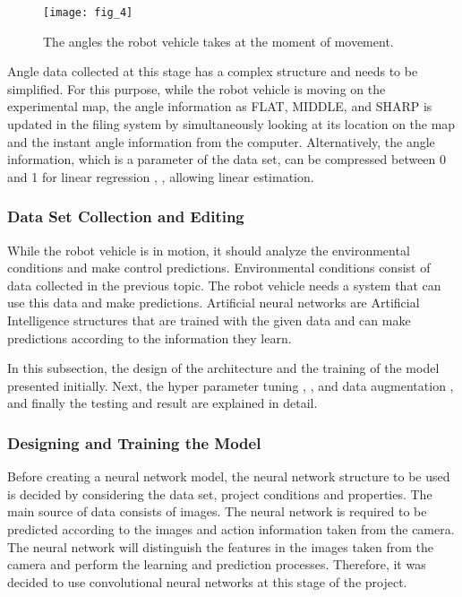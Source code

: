 \documentclass[twocolumn, switch]{article} %
\begin{document}
\begin{figure}[h]
    \centering
    \texttt{[image: fig\_4]}
    \caption{The angles the robot vehicle takes at the moment of
movement.}
    \label{fig:fig4}
\end{figure}

Angle data collected at this stage has a complex structure and
needs to be simplified. For this purpose, while the robot
vehicle is moving on the experimental map, the angle
information as FLAT, MIDDLE, and SHARP is updated in
the filing system by simultaneously looking at its location on
the map and the instant angle information from the computer.
Alternatively, the angle information, which is a parameter of
the data set, can be compressed between 0 and 1 for linear
regression \cite{edwards1984introduction}, \cite{montgomery2021introduction}, 
allowing linear estimation.

\subsubsection{Data Set Collection and Editing}

While the robot vehicle is in motion, it should analyze the
environmental conditions and make control predictions.
Environmental conditions consist of data collected in the
previous topic. The robot vehicle needs a system that can use
this data and make predictions. Artificial neural networks are Artificial Intelligence
structures that are trained with the given data and can make
predictions according to the information they learn.

In this subsection, the design of the architecture and the
training of the model presented initially. Next, the hyper
parameter tuning \cite{bergstra2011algorithms}, \cite{feurer2019hyperparameter}, 
and data augmentation \cite{mikolajczyk2018data}, and
finally the testing and result are explained in detail.

\subsubsection{Designing and Training the Model}

Before creating a neural network model, the neural network
structure to be used is decided by considering the data set,
project conditions and properties. The main source of data
consists of images. The neural network is required to be
predicted according to the images and action information
taken from the camera. The neural network will distinguish
the features in the images taken from the camera and perform
the learning and prediction processes. Therefore, it was
decided to use convolutional neural networks at this stage of
the project.
\end{document}
